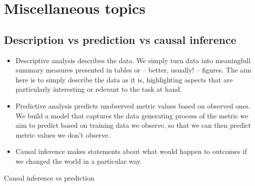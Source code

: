 \documentclass[
  letterpaper,
  DIV=11,
  numbers=noendperiod]{scrreprt}
\begin{document}

\hypertarget{miscellaneous-topics}{%
\chapter{Miscellaneous topics}\label{miscellaneous-topics}}

\hypertarget{description-vs-prediction-vs-causal-inference}{%
\section{Description vs prediction vs causal
inference}\label{description-vs-prediction-vs-causal-inference}}

\begin{itemize}
\item
  Descriptive analysis describes the data. We simply turn data into
  meaningfull summary measures presented in tables or -- better,
  usually! -- figures. The aim here is to simply describe the data as it
  is, highlighting aspects that are particularly interesting or relevant
  to the task at hand.
\item
  Predictive analysis predicts unobserved metric values based on
  observed ones. We build a model that captures the data generating
  process of the metric we aim to predict based on training data we
  observe, so that we can then predict metric values we don't observe.
\item
  Causal inference makes statements about what would happen to outcomes
  if we changed the world in a particular way.
\end{itemize}

Causal inference vs prediction
\end{document}

